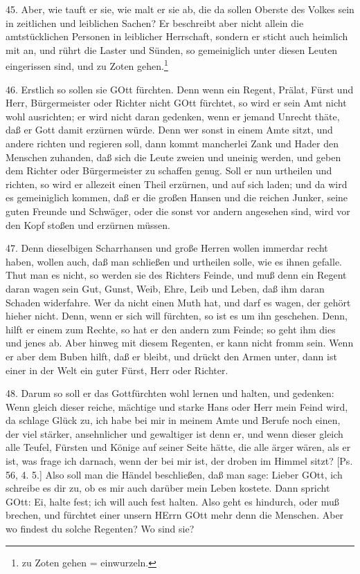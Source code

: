 45. Aber, wie tauft er sie, wie malt er sie ab, die da sollen Oberste des Volkes sein in zeitlichen und leiblichen Sachen? Er beschreibt aber nicht allein die amtstücklichen Personen in leiblicher Herrschaft, sondern er sticht auch heimlich mit an, und rührt die Laster und Sünden, so gemeiniglich unter diesen Leuten eingerissen sind, und zu Zoten gehen.\footnote{zu Zoten gehen = einwurzeln.}

46. Erstlich so sollen sie GOtt fürchten. Denn wenn ein Regent, Prälat, Fürst und Herr, Bürgermeister oder Richter nicht GOtt fürchtet, so wird er sein Amt nicht wohl ausrichten; er wird nicht daran gedenken, wenn er jemand Unrecht thäte, daß er Gott damit erzürnen
würde. Denn wer sonst in einem Amte sitzt, und andere richten und regieren soll, dann kommt mancherlei Zank und Hader den Menschen zuhanden, daß sich die Leute zweien und uneinig werden, und geben dem Richter oder Bürgermeister zu schaffen genug. Soll er nun urtheilen und richten, so wird er allezeit einen Theil erzürnen, und auf sich laden; und da wird es gemeiniglich kommen, daß er die großen Hansen und die reichen Junker, seine guten Freunde und Schwäger, oder die sonst vor andern angesehen sind, wird vor den Kopf stoßen und erzürnen müssen.

47. Denn dieselbigen Scharrhansen und große Herren wollen immerdar recht haben, wollen auch, daß man schließen und urtheilen solle, wie es ihnen gefalle. Thut man es nicht, so werden sie des Richters Feinde, und muß denn ein Regent daran wagen sein Gut, Gunst, Weib, Ehre, Leib und Leben, daß ihm daran Schaden widerfahre. Wer da nicht einen Muth hat, und darf es wagen, der gehört hieher nicht. Denn, wenn er sich will fürchten, so ist es um ihn geschehen. Denn, hilft er einem zum Rechte, so hat er den andern zum Feinde; so geht ihm dies und jenes ab. Aber hinweg mit diesem Regenten, er kann nicht fromm sein. Wenn er aber dem Buben hilft, daß er bleibt, und drückt den Armen unter, dann ist einer in der Welt ein guter Fürst, Herr oder Richter.

48. Darum so soll er das Gottfürchten wohl lernen und halten, und gedenken: Wenn gleich dieser reiche, mächtige und starke Hans oder Herr mein Feind wird, da schlage Glück zu, ich habe bei mir in meinem Amte und Berufe noch einen, der viel stärker, ansehnlicher und gewaltiger ist denn er, und wenn dieser gleich alle Teufel, Fürsten und Könige auf seiner Seite hätte, die alle ärger wären, als er ist, was frage ich darnach, wenn der bei mir ist, der droben im Himmel sitzt? [Ps. 56, 4. 5.] Also soll man die Händel beschließen, daß man sage: Lieber GOtt, ich schreibe es dir zu, ob es mir auch darüber mein Leben kostete. Dann spricht GOtt: Ei, halte fest; ich will auch fest halten. Also geht es hindurch, oder muß brechen, und fürchtet einer unsern HErrn GOtt mehr denn die Menschen. Aber wo findest du solche Regenten? Wo sind sie?

